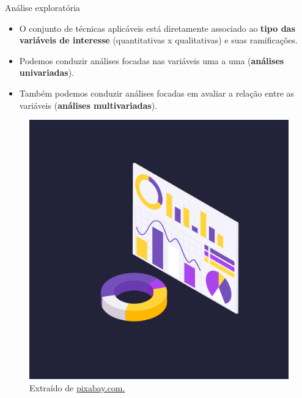 \documentclass[
  ignorenonframetext,
  serif,
  professionalfont,
  usenames,
  dvipsnames,
  aspectratio = 169]{beamer}
\providecommand{\tightlist}{%
  \setlength{\itemsep}{0pt}\setlength{\parskip}{0pt}}
\renewcommand{\tightlist}{%
  \setlength{\itemsep}{0\baselineskip}
  \setlength{\parskip}{0.25\baselineskip}
}
\def\beginAHalfColumn{\begin{minipage}{0.49\textwidth}}%
\def\endColumns{\end{minipage}}%
\begin{document}
\begin{frame}{Análise exploratória}
\label{anuxe1lise-exploratuxf3ria-4}
\beginAHalfColumn

\begin{itemize}
\tightlist
\item
  O conjunto de técnicas aplicáveis está diretamente associado ao
  \textbf{tipo das variáveis de interesse} (quantitativas x
  qualitativas) e suas ramificações.
\end{itemize}

\vspace{0.3cm}

\begin{itemize}
\tightlist
\item
  Podemos conduzir análises focadas nas variáveis uma a uma
  (\textbf{análises univariadas}).
\end{itemize}

\vspace{0.3cm}

\begin{itemize}
\tightlist
\item
  Também podemos conduzir análises focadas em avaliar a relação entre as
  variáveis (\textbf{análises multivariadas}).
\end{itemize}

\endColumns
\beginAHalfColumn

\begin{figure}

{\centering \includegraphics[width=0.8\linewidth]{./img/exploratoria} 

}

\caption{Extraído de \href{https://cdn.pixabay.com/photo/2020/08/03/10/00/graph-5459708_1280.png}{pixabay.com.}}\label{fig:unnamed-chunk-4}
\end{figure}

\endColumns
\end{frame}
\end{document}
